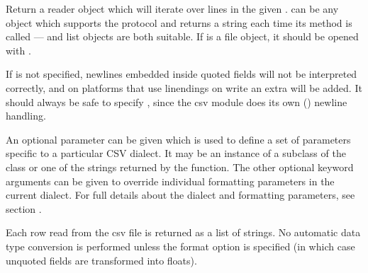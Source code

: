 \documentclass[letterpaper,10pt,english]{sphinxmanual}
\begin{document}
\begin{fulllineitems}
\label{\detokenize{csv:csv.reader}}
Return a reader object which will iterate over lines in the given .
 can be any object which supports the  protocol and returns a
string each time its  method is called —  and list objects are both suitable.   If  is a file object,
it should be opened with . %
\begin{footnote}[1]\sphinxAtStartFootnote
If  is not specified, newlines embedded inside quoted fields
will not be interpreted correctly, and on platforms that use  linendings
on write an extra  will be added.  It should always be safe to specify
, since the csv module does its own
() newline handling.
%
\end{footnote}  An optional
 parameter can be given which is used to define a set of parameters
specific to a particular CSV dialect.  It may be an instance of a subclass of
the {\hyperref[\detokenize{csv:csv.Dialect}]{}} class or one of the strings returned by the
{\hyperref[\detokenize{csv:csv.list_dialects}]{}} function.  The other optional  keyword arguments
can be given to override individual formatting parameters in the current
dialect.  For full details about the dialect and formatting parameters, see
section {\hyperref[\detokenize{csv:csv-fmt-params}]{}}.

Each row read from the csv file is returned as a list of strings.  No
automatic data type conversion is performed unless the  format
option is specified (in which case unquoted fields are transformed into floats).


\end{fulllineitems}
\end{document}
